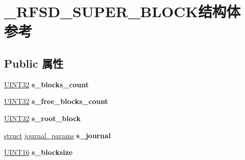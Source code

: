 \hypertarget{struct___r_f_s_d___s_u_p_e_r___b_l_o_c_k}{}\section{\+\_\+\+R\+F\+S\+D\+\_\+\+S\+U\+P\+E\+R\+\_\+\+B\+L\+O\+C\+K结构体 参考}
\label{struct___r_f_s_d___s_u_p_e_r___b_l_o_c_k}
\subsection*{Public 属性}
\begin{DoxyCompactItemize}
\item 
\mbox{\label{struct___r_f_s_d___s_u_p_e_r___b_l_o_c_k_acdaccfddf956606d94647c07129e4a4c}} 
\hyperlink{_processor_bind_8h_ae1e6edbbc26d6fbc71a90190d0266018}{U\+I\+N\+T32} {\bfseries s\+\_\+blocks\+\_\+count}
\item 
\mbox{\label{struct___r_f_s_d___s_u_p_e_r___b_l_o_c_k_af883b5e8d5d73e715291ef5eb7ecff5a}} 
\hyperlink{_processor_bind_8h_ae1e6edbbc26d6fbc71a90190d0266018}{U\+I\+N\+T32} {\bfseries s\+\_\+free\+\_\+blocks\+\_\+count}
\item 
\mbox{\label{struct___r_f_s_d___s_u_p_e_r___b_l_o_c_k_a7cc955f8d4ed700307c1a1b4371fe134}} 
\hyperlink{_processor_bind_8h_ae1e6edbbc26d6fbc71a90190d0266018}{U\+I\+N\+T32} {\bfseries s\+\_\+root\+\_\+block}
\item 
\mbox{\label{struct___r_f_s_d___s_u_p_e_r___b_l_o_c_k_a626a21f191ca94663aa1d8a02ae5d9c6}} 
\hyperlink{interfacestruct}{struct} \hyperlink{structjournal__params}{journal\+\_\+params} {\bfseries s\+\_\+journal}
\item 
\mbox{\label{struct___r_f_s_d___s_u_p_e_r___b_l_o_c_k_a55199917b8804e7acb948ce6be8b6854}} 
\hyperlink{_processor_bind_8h_a09f1a1fb2293e33483cc8d44aefb1eb1}{U\+I\+N\+T16} {\bfseries s\+\_\+blocksize}
\item 
\mbox{\label{struct___r_f_s_d___s_u_p_e_r___b_l_o_c_k_adc56e4c5e4dd8fcd5f2fafc8b9df7820}} 

\end{DoxyCompactItemize}
